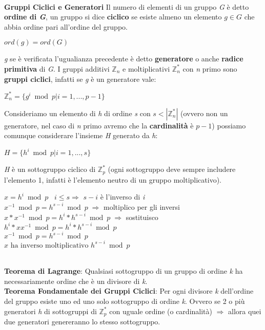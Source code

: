 \   \\ 
\textbf{Gruppi Ciclici e Generatori}
\newline
Il numero di elementi di un gruppo \textit{G} è detto \textbf{ordine di \textit{G}}, un gruppo si dice \textbf{ciclico} se esiste almeno un elemento $g \in G$ che abbia ordine pari all'ordine del gruppo.
\begin{center}
    $ord(g) = ord(G)$
\end{center}
\textit{g} se è verificata l'ugualianza precedente è detto \textbf{generatore} o anche \textbf{radice primitiva} di \textit{G}.
\newline
I gruppi additivi $\mathbb{Z}_n$ e moltiplicativi $\mathbb{Z}_n^*$ con \textit{n} primo sono \textbf{gruppi ciclici}, infatti se \textit{g} è un generatore vale:
\begin{center}
    $\mathbb{Z}_n^* = \{g^i \bmod p | i = 1, ..., p - 1\}$    
\end{center}
Consideriamo un elemento di \textit{h} di ordine \textit{s} con $s < | \mathbb{Z}_n^* | $ (ovvero non un generatore, nel caso di \textit{n} primo avremo che la \textbf{cardinalità} è $p - 1$) possiamo comunque considerare l'insieme \textit{H} generato da \textit{h}:
\begin{center}
    $H = \{h^i \bmod p | i = 1, ..., s\}$
\end{center}
\textit{H} è un sottogruppo ciclico di $\mathbb{Z}_p^*$ (ogni sottogruppo deve sempre includere l'elemento 1, infatti è l'elemento neutro di un gruppo moltiplicativo).
\begin{center}
    $x = h^i \bmod p \;\;\; i \leq s \Rightarrow$ $s - i$ è l'inverso di \textit{i} \\
    $x^{-1} \bmod p = h^{s-i} \bmod p\;\Rightarrow$ moltiplico per gli inversi \\
    $x*x^{-1} \bmod p = h^i*h^{s-i} \bmod p\;\Rightarrow$ sostituisco \\
    $h^i * xx^{-1} \bmod p = h^i * h^{s-i} \bmod p$ \\
    $x^{-1} \bmod p = h^{s-i} \bmod p$ \\
    $x \text{ ha inverso moltiplicativo } h^{s-i} \bmod p$
\end{center}
\   \\
\textbf{Teorema di Lagrange}: Qualsiasi sottogruppo di un gruppo di ordine \textit{k} ha necessariamente ordine che è un divisore di \textit{k}.
\\ \newline
\textbf{Teorema Fondamentale dei Gruppi Ciclici}: Per ogni divisore \textit{k} dell'ordine del gruppo esiste uno ed uno solo sottogruppo di ordine \textit{k}. Ovvero se 2 o più generatori \textit{h} di sottogruppi di $\mathbb{Z}_p^*$ con uguale ordine (o cardinalità) $\Rightarrow$ allora quei due generatori genereranno lo stesso sottogruppo.
